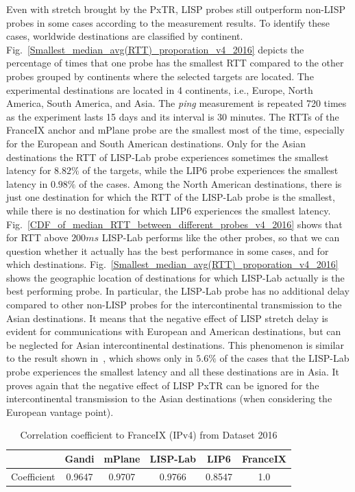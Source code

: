 Even with stretch brought by the PxTR, LISP probes still outperform non-LISP probes in some cases according to the measurement results. To identify these cases, worldwide destinations are classified by continent.
Fig.~\ref{Smallest_median_avg(RTT)_proporation_v4_2016} depicts the percentage of times that one probe has the smallest RTT compared to the other probes grouped by continents where the selected targets are located.
The experimental destinations are located in 4 continents, i.e., Europe, North America, South America, and Asia. The \emph{ping} measurement is repeated 720 times as the experiment lasts 15 days and its interval is 30 minutes. The RTTs of the FranceIX anchor and mPlane probe are the smallest most of the time, especially for the European and South American destinations. Only for the Asian destinations the RTT of LISP-Lab probe experiences sometimes the smallest latency for $8.82\%$ of the targets, while the LIP6 probe experiences the smallest latency in $0.98\%$ of the cases. Among the North American destinations, there is just one destination for which the RTT of the LISP-Lab probe is the smallest, while there is no destination for which LIP6 experiences the smallest latency. Fig.~\ref{CDF_of_median_RTT_between_different_probes_v4_2016} shows that for RTT above $200ms$ LISP-Lab performs like the other probes, so that we can question whether it actually has the best performance in some cases, and for which destinations. Fig.~\ref{Smallest_median_avg(RTT)_proporation_v4_2016} shows the geographic location of destinations for which LISP-Lab actually is the best performing probe. In particular, the LISP-Lab probe has no additional delay compared to other non-LISP probes for the intercontinental transmission to the Asian destinations. It means that the negative effect of LISP stretch delay is evident for communications with European and American destinations, but can be neglected for Asian intercontinental destinations. This phenomenon is similar to the result shown in~\cite{li2016performance}, which shows only in $5.6\%$ of the cases that the LISP-Lab probe experiences the smallest latency and all these destinations are in Asia. It proves again that the negative effect of LISP PxTR can be ignored for the intercontinental transmission to the Asian destinations (when considering the European vantage point).

 \begin{table}[!tb]
 	\centering
 	\caption{Correlation coefficient to FranceIX (IPv4) from Dataset 2016}
 	\label{correlation_v4_2016}{
 		\begin{tabular}{@{}c|c|c|c|c|c@{}}
 			\hline\hline
 			 & Gandi  & mPlane  & LISP-Lab  & LIP6 &  FranceIX \\ \hline
 			Coefficient &  0.9647 & 0.9707 & 0.9766 & 0.8547 & 1.0     	\\  \hline\hline                 
 		\end{tabular}
 	}
 \end{table}

